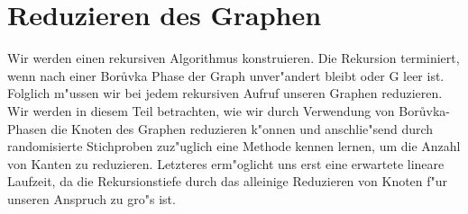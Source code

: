 \section{Reduzieren des Graphen}

Wir werden einen rekursiven Algorithmus konstruieren. 
    Die Rekursion terminiert, wenn nach einer Bor\r uvka Phase der Graph 
    unver"andert bleibt oder G leer ist.
    Folglich m"ussen wir
    bei jedem rekursiven Aufruf unseren Graphen reduzieren. 
    Wir werden in 
    diesem Teil betrachten, wie wir durch Verwendung von Bor\r uvka-Phasen die
    Knoten des Graphen reduzieren k"onnen und anschlie"send durch randomisierte
    Stichproben zuz"uglich eine Methode kennen lernen, um die Anzahl von Kanten
    zu reduzieren. 
    Letzteres erm"oglicht uns erst eine erwartete lineare 
    Laufzeit, da die Rekursionstiefe durch das alleinige Reduzieren von Knoten
    f"ur unseren Anspruch zu gro"s ist.\\



